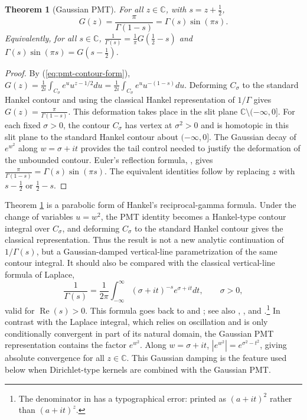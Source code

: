 \documentclass[12pt,english]{article}
\theoremstyle{plain} %
\newtheorem{theorem}{Theorem}
\theoremstyle{remark} %
\begin{document}
\begin{theorem}[Gaussian PMT]
\label{thm:gaussian-pmt}
For all $z\in\mathbb{C}$, with $s=z+\tfrac{1}{2}$,
\begin{equation}
G(z)=\frac{\pi}{\Gamma(1-s)}
=
\Gamma(s)\sin(\pi s).
\label{eq:G-s-form}
\end{equation}
Equivalently, for all $s\in\mathbb{C}$,
$\frac{1}{\Gamma(s)}=\frac{1}{\pi}G(\tfrac{1}{2}-s)$ and $\Gamma(s)\sin(\pi s)
=G(s-\tfrac{1}{2})$.
\end{theorem}
\begin{proof}
By (\ref{eq:pmt-contour-form}),
$G(z)=\frac{1}{2i}\int_{C_\sigma}e^u u^{z-1/2}du
=
\frac{1}{2i}\int_{C_\sigma}e^u u^{-(1-s)}du$. 
Deforming $C_\sigma$ to the standard Hankel contour and using the classical Hankel representation of $1/\Gamma$ \cite[5.9.2]{DLMF} gives $G(z)=\frac{\pi}{\Gamma(1-s)}$.
This deformation takes place in the slit plane $\mathbb{C}\setminus(-\infty,0]$.
For each fixed $\sigma>0$, the contour $C_\sigma$ has vertex at $\sigma^2>0$
and is homotopic in this slit plane to the standard Hankel contour about
$(-\infty,0]$. The Gaussian decay of $e^{w^2}$ along $w=\sigma+it$ provides
the tail control needed to justify the deformation of the unbounded contour.
Euler's reflection formula, \citet[5.5.3]{DLMF}, gives $\frac{\pi}{\Gamma(1-s)}=\Gamma(s)\sin(\pi s)$. 
The equivalent identities follow by replacing $z$ with $s-\tfrac{1}{2}$ or $\tfrac{1}{2}-s$.
\end{proof}

Theorem \ref{thm:gaussian-pmt} is a parabolic form of Hankel's reciprocal-gamma formula. Under the change of variables $u=w^2$, the PMT identity becomes a Hankel-type contour integral over $C_\sigma$, and deforming $C_\sigma$ to the standard Hankel contour gives the classical representation. Thus the result is not a new analytic continuation of $1/\Gamma(s)$, but a Gaussian-damped vertical-line parametrization of the same contour integral. It should also be compared with the classical vertical-line formula of Laplace,
$$
\frac{1}{\Gamma(s)}
=
\frac{1}{2\pi}
\int_{-\infty}^{\infty}(\sigma+it)^{-s}e^{\sigma+it}dt,
\qquad \sigma>0,
$$
valid for $\operatorname{Re}(s)>0$. This formula goes back to \citet[p. 264]{Laplace:1785} and \citet[p. 134]{Laplace:1812}; see also \citet[Section 63.8]{Nielsen:1906}, \citet{Pribitkin:2002}, and \citet[eq. 8.315.2]{GradshteynRyzhik:2007}.\footnote{The denominator in \citet[eq. 8.315.2]{GradshteynRyzhik:2007} has a typographical error: printed as $(a+it)^2$ rather than $(a+it)^z$.} In contrast with the Laplace integral, which relies on oscillation and is only conditionally convergent in part of its natural domain, the Gaussian PMT representation contains the factor $e^{w^2}$. Along $w=\sigma+it$,
$|e^{w^2}|=e^{\sigma^2-t^2}$, giving absolute convergence for all $z\in\mathbb{C}$. This Gaussian damping is the feature used below when Dirichlet-type kernels are combined with the Gaussian PMT.
\end{document}
